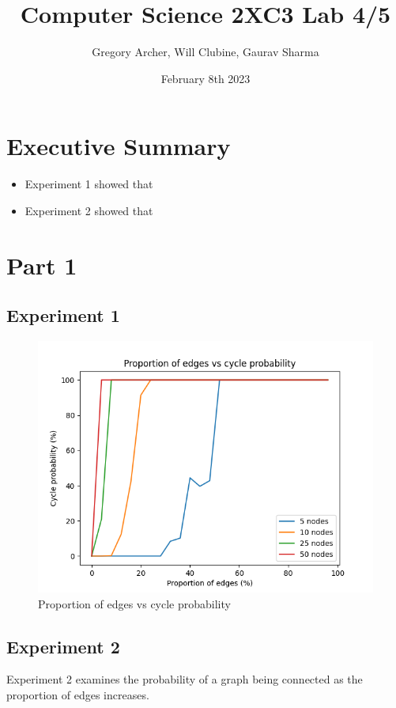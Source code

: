 \documentclass[titlepage]{article}
\title{Computer Science 2XC3 Lab 4/5}
\author{Gregory Archer, Will Clubine, Gaurav Sharma}
\date{February 8th 2023}
\begin{document}
\maketitle
\tableofcontents
\listoffigures

\newpage

\section{Executive Summary}
\begin{itemize}
    \item Experiment 1 showed that
    \item Experiment 2 showed that
\end{itemize}

\section{Part 1}

\subsection{Experiment 1}

\begin{figure}[H]
    \centering
    \includegraphics[width=0.8\linewidth]{experiment_1.png}
    \caption{Proportion of edges vs cycle probability}
    \label{fig:edges_vs_cycle}
\end{figure}


\subsection{Experiment 2}

Experiment 2 examines the probability of a graph being connected as the proportion of edges increases.
\end{document}
